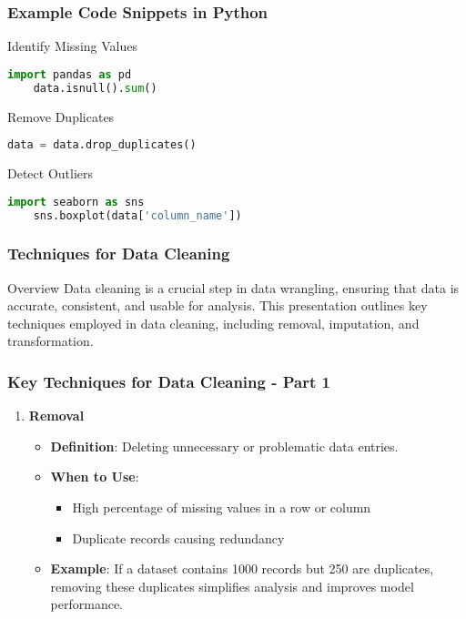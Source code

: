 \documentclass[aspectratio=169]{beamer}
\begin{document}
\begin{frame}[fragile]
    \frametitle{Example Code Snippets in Python}
    \begin{block}{Identify Missing Values}
    \begin{lstlisting}[language=Python]
    import pandas as pd
    data.isnull().sum()
    \end{lstlisting}
    \end{block}

    \begin{block}{Remove Duplicates}
    \begin{lstlisting}[language=Python]
    data = data.drop_duplicates()
    \end{lstlisting}
    \end{block}

    \begin{block}{Detect Outliers}
    \begin{lstlisting}[language=Python]
    import seaborn as sns
    sns.boxplot(data['column_name'])
    \end{lstlisting}
    \end{block}
\end{frame}

\begin{frame}[fragile]
    \frametitle{Techniques for Data Cleaning}
    \begin{block}{Overview}
        Data cleaning is a crucial step in data wrangling, ensuring that data is accurate, consistent, and usable for analysis. This presentation outlines key techniques employed in data cleaning, including removal, imputation, and transformation.
    \end{block}
\end{frame}

\begin{frame}[fragile]
    \frametitle{Key Techniques for Data Cleaning - Part 1}
    \begin{enumerate}
        \item \textbf{Removal}
        \begin{itemize}
            \item \textbf{Definition}: Deleting unnecessary or problematic data entries.
            \item \textbf{When to Use}: 
            \begin{itemize}
                \item High percentage of missing values in a row or column
                \item Duplicate records causing redundancy
            \end{itemize}
            \item \textbf{Example}: If a dataset contains 1000 records but 250 are duplicates, removing these duplicates simplifies analysis and improves model performance.
        \end{itemize}
    \end{enumerate}
\end{frame}
\end{document}
